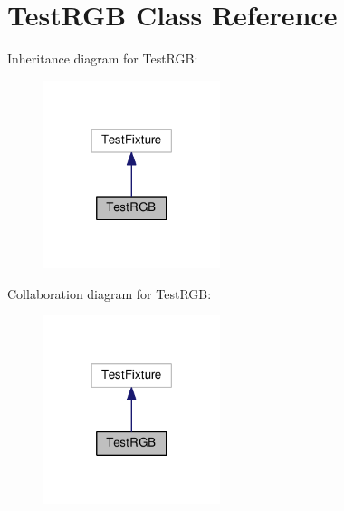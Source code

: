 \hypertarget{class_test_r_g_b}{}\section{Test\+R\+GB Class Reference}
\label{class_test_r_g_b}


Inheritance diagram for Test\+R\+GB\+:
\nopagebreak
\begin{figure}[H]
\begin{center}
\leavevmode
\includegraphics[width=146pt]{class_test_r_g_b__inherit__graph}
\end{center}
\end{figure}


Collaboration diagram for Test\+R\+GB\+:
\nopagebreak
\begin{figure}[H]
\begin{center}
\leavevmode
\includegraphics[width=146pt]{class_test_r_g_b__coll__graph}
\end{center}
\end{figure}
